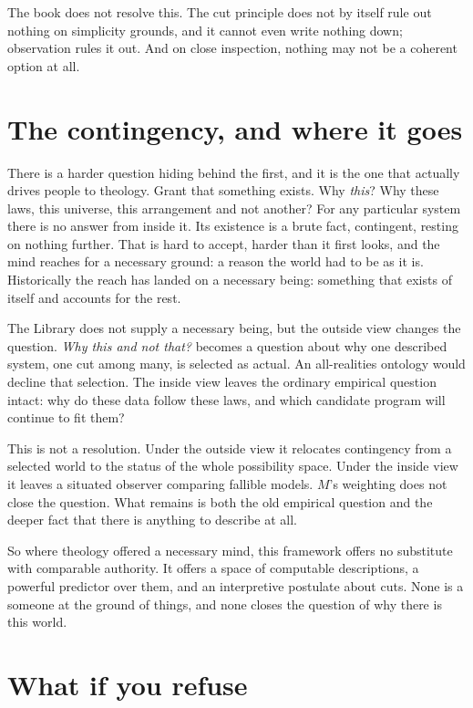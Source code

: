The book does not resolve this. The cut principle does not by itself rule out nothing on simplicity grounds, and it cannot even write nothing down; observation rules it out. And on close inspection, nothing may not be a coherent option at all.

\section*{The contingency, and where it goes}

There is a harder question hiding behind the first, and it is the one that actually drives people to theology. Grant that something exists. Why \emph{this}? Why these laws, this universe, this arrangement and not another? For any particular system there is no answer from inside it. Its existence is a brute fact, contingent, resting on nothing further. That is hard to accept, harder than it first looks, and the mind reaches for a necessary ground: a reason the world had to be as it is. Historically the reach has landed on a necessary being: something that exists of itself and accounts for the rest.

The Library does not supply a necessary being, but the outside view changes the question. \emph{Why this and not that?} becomes a question about why one described system, one cut among many, is selected as actual. An all-realities ontology would decline that selection. The inside view leaves the ordinary empirical question intact: why do these data follow these laws, and which candidate program will continue to fit them?

This is not a resolution. Under the outside view it relocates contingency from a selected world to the status of the whole possibility space. Under the inside view it leaves a situated observer comparing fallible models. $M$'s weighting does not close the question. What remains is both the old empirical question and the deeper fact that there is anything to describe at all.

So where theology offered a necessary mind, this framework offers no substitute with comparable authority. It offers a space of computable descriptions, a powerful predictor over them, and an interpretive postulate about cuts. None is a someone at the ground of things, and none closes the question of why there is this world.

\section*{What if you refuse}

